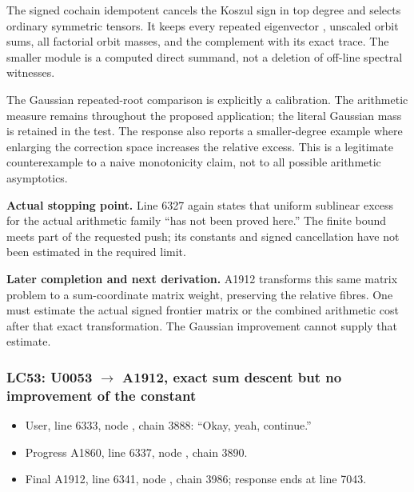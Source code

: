 The signed cochain idempotent \protect{}
cancels the Koszul sign in top degree and selects ordinary symmetric
tensors. It keeps every repeated eigenvector
\protect{}, unscaled orbit sums, all factorial orbit
masses, and the complement with its exact trace. The smaller module is a
computed direct summand, not a deletion of off-line spectral witnesses.

The Gaussian repeated-root comparison is explicitly a calibration. The
arithmetic measure remains \protect{} throughout
the proposed application; the literal Gaussian mass
\protect{} is retained in the test. The response also
reports a smaller-degree example where enlarging the correction space
increases the relative excess. This is a legitimate counterexample to a
naive monotonicity claim, not to all possible arithmetic asymptotics.

\textbf{Actual stopping point.} Line 6327 again states that uniform
sublinear excess for the actual arithmetic family ``has not been proved
here.'' The finite bound meets part of the requested push; its constants
and signed cancellation have not been estimated in the required limit.

\textbf{Later completion and next derivation.} A1912 transforms this
same matrix problem to a sum-coordinate matrix weight, preserving the
relative fibres. One must estimate the actual signed frontier matrix or
the combined arithmetic \protect{} cost after that
exact transformation. The Gaussian improvement cannot supply that
estimate.

\subsubsection{\texorpdfstring{LC53: U0053
\allowbreak{}\ensuremath{→}\allowbreak{} A1912, exact sum descent but no
improvement of the
constant}{LC53: U0053  A1912, exact sum descent but no improvement of the constant}}\label{TranscriptLedgerStage:lc53-u0053-a1912-exact-sum-descent-but-no-improvement-of-the-constant}

\begin{itemize}
\tightlist
\item
  User, line 6333, node
  \protect{}, chain 3888:
  ``Okay, yeah, continue.''
\item
  Progress A1860, line 6337, node
  \protect{}, chain 3890.
\item
  Final A1912, line 6341, node
  \protect{}, chain 3986;
  response ends at line 7043.
\end{itemize}

